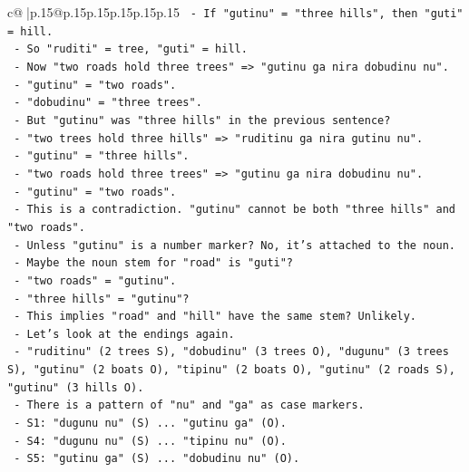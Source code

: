 \documentclass{article}
\begin{document}
{\begin{supertabular}{c@{$\;$}|p{.15\linewidth}@{}p{.15\linewidth}p{.15\linewidth}p{.15\linewidth}p{.15\linewidth}p{.15\linewidth}}
{{{\texttt{              {-} If "gutinu" = "three hills", then "guti" = hill.} \\
\texttt{            {-} So "ruditi" = tree, "guti" = hill.} \\
\texttt{          {-} Now "two roads hold three trees" => "gutinu ga nira dobudinu nu".} \\
\texttt{            {-} "gutinu" = "two roads".} \\
\texttt{            {-} "dobudinu" = "three trees".} \\
\texttt{            {-} But "gutinu" was "three hills" in the previous sentence?} \\
\texttt{            {-} "two trees hold three hills" => "ruditinu ga nira gutinu nu".} \\
\texttt{              {-} "gutinu" = "three hills".} \\
\texttt{            {-} "two roads hold three trees" => "gutinu ga nira dobudinu nu".} \\
\texttt{              {-} "gutinu" = "two roads".} \\
\texttt{            {-} This is a contradiction. "gutinu" cannot be both "three hills" and "two roads".} \\
\texttt{            {-} Unless "gutinu" is a number marker? No, it's attached to the noun.} \\
\texttt{            {-} Maybe the noun stem for "road" is "guti"?} \\
\texttt{            {-} "two roads" = "gutinu".} \\
\texttt{            {-} "three hills" = "gutinu"?} \\
\texttt{            {-} This implies "road" and "hill" have the same stem? Unlikely.} \\
\texttt{            {-} Let's look at the endings again.} \\
\texttt{            {-} "ruditinu" (2 trees S), "dobudinu" (3 trees O), "dugunu" (3 trees S), "gutinu" (2 boats O), "tipinu" (2 boats O), "gutinu" (2 roads S), "gutinu" (3 hills O).} \\
\texttt{            {-} There is a pattern of "nu" and "ga" as case markers.} \\
\texttt{            {-} S1: "dugunu nu" (S) ... "gutinu ga" (O).} \\
\texttt{            {-} S4: "dugunu nu" (S) ... "tipinu nu" (O).} \\
\texttt{            {-} S5: "gutinu ga" (S) ... "dobudinu nu" (O).} \\
}}}
\end{supertabular}}
\end{document}
